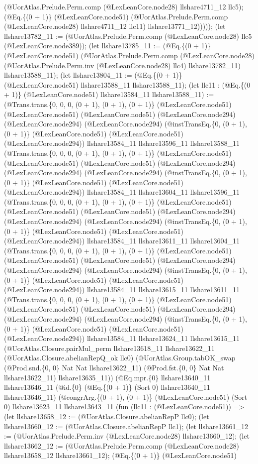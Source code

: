 \documentclass[11pt]{article}
\begin{document}
(@UorAtlas.Prelude.Perm.comp (@LexLeanCore.node28) llshare4711\_12 llc5); (@Eq.\{(0 + 1)\} (@LexLeanCore.node51) (@UorAtlas.Prelude.Perm.comp (@LexLeanCore.node28) llshare4711\_12 llc11) llshare13771\_12))))); (let llshare13782\_11 := (@UorAtlas.Prelude.Perm.comp (@LexLeanCore.node28) llc5 (@LexLeanCore.node389)); (let llshare13785\_11 := (@Eq.\{(0 + 1)\} (@LexLeanCore.node51) (@UorAtlas.Prelude.Perm.comp (@LexLeanCore.node28) (@UorAtlas.Prelude.Perm.inv (@LexLeanCore.node28) llc4) llshare13782\_11) llshare13588\_11); (let llshare13804\_11 := (@Eq.\{(0 + 1)\} (@LexLeanCore.node51) llshare13588\_11 llshare13588\_11); (let llc11 : (@Eq.\{(0 + 1)\} (@LexLeanCore.node51) llshare13584\_11 llshare13588\_11) := (@Trans.trans.\{0, 0, 0, (0 + 1), (0 + 1), (0 + 1)\} (@LexLeanCore.node51) (@LexLeanCore.node51) (@LexLeanCore.node51) (@LexLeanCore.node294) (@LexLeanCore.node294) (@LexLeanCore.node294) (@instTransEq.\{0, (0 + 1), (0 + 1)\} (@LexLeanCore.node51) (@LexLeanCore.node51) (@LexLeanCore.node294)) llshare13584\_11 llshare13596\_11 llshare13588\_11 (@Trans.trans.\{0, 0, 0, (0 + 1), (0 + 1), (0 + 1)\} (@LexLeanCore.node51) (@LexLeanCore.node51) (@LexLeanCore.node51) (@LexLeanCore.node294) (@LexLeanCore.node294) (@LexLeanCore.node294) (@instTransEq.\{0, (0 + 1), (0 + 1)\} (@LexLeanCore.node51) (@LexLeanCore.node51) (@LexLeanCore.node294)) llshare13584\_11 llshare13604\_11 llshare13596\_11 (@Trans.trans.\{0, 0, 0, (0 + 1), (0 + 1), (0 + 1)\} (@LexLeanCore.node51) (@LexLeanCore.node51) (@LexLeanCore.node51) (@LexLeanCore.node294) (@LexLeanCore.node294) (@LexLeanCore.node294) (@instTransEq.\{0, (0 + 1), (0 + 1)\} (@LexLeanCore.node51) (@LexLeanCore.node51) (@LexLeanCore.node294)) llshare13584\_11 llshare13611\_11 llshare13604\_11 (@Trans.trans.\{0, 0, 0, (0 + 1), (0 + 1), (0 + 1)\} (@LexLeanCore.node51) (@LexLeanCore.node51) (@LexLeanCore.node51) (@LexLeanCore.node294) (@LexLeanCore.node294) (@LexLeanCore.node294) (@instTransEq.\{0, (0 + 1), (0 + 1)\} (@LexLeanCore.node51) (@LexLeanCore.node51) (@LexLeanCore.node294)) llshare13584\_11 llshare13615\_11 llshare13611\_11 (@Trans.trans.\{0, 0, 0, (0 + 1), (0 + 1), (0 + 1)\} (@LexLeanCore.node51) (@LexLeanCore.node51) (@LexLeanCore.node51) (@LexLeanCore.node294) (@LexLeanCore.node294) (@LexLeanCore.node294) (@instTransEq.\{0, (0 + 1), (0 + 1)\} (@LexLeanCore.node51) (@LexLeanCore.node51) (@LexLeanCore.node294)) llshare13584\_11 llshare13624\_11 llshare13615\_11 (@UorAtlas.Closure.pairMul\_perm llshare13618\_11 llshare13622\_11 (@UorAtlas.Closure.abelianRepQ\_ok llc0) (@UorAtlas.Group.tabOK\_swap (@Prod.snd.\{0, 0\} Nat Nat llshare13622\_11) (@Prod.fst.\{0, 0\} Nat Nat llshare13622\_11) llshare13635\_11)) (@Eq.mpr.\{0\} llshare13640\_11 llshare13646\_11 (@id.\{0\} (@Eq.\{(0 + 1)\} (Sort 0) llshare13640\_11 llshare13646\_11) (@congrArg.\{(0 + 1), (0 + 1)\} (@LexLeanCore.node51) (Sort 0) llshare13623\_11 llshare13643\_11 (fun (llc11 : (@LexLeanCore.node51)) => (let llshare13658\_12 := (@UorAtlas.Closure.abelianRepP llc0); (let llshare13660\_12 := (@UorAtlas.Closure.abelianRepP llc1); (let llshare13661\_12 := (@UorAtlas.Prelude.Perm.inv (@LexLeanCore.node28) llshare13660\_12); (let llshare13662\_12 := (@UorAtlas.Prelude.Perm.comp (@LexLeanCore.node28) llshare13658\_12 llshare13661\_12); (@Eq.\{(0 + 1)\} (@LexLeanCore.node51) 
\end{document}
